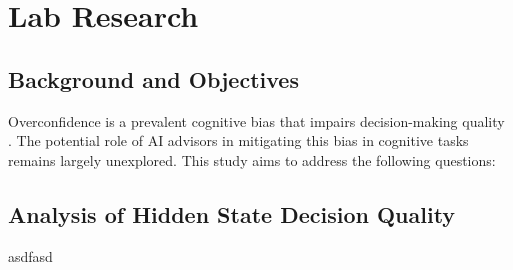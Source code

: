 \documentclass[12pt,a4paper, man]{article}
\begin{document}
\begingroup
{} 
\onehalfspacing 
\tableofcontents
\clearpage
\endgroup


\begingroup
\setlength{\parskip}{0.2\baselineskip}
\section{Lab Research}
\subsection{Background and Objectives}

Overconfidence is a prevalent cognitive bias that impairs decision-making quality \parencite{achtzigerFastRationalResponseTimes2014}. The potential role of AI advisors in mitigating this bias in cognitive tasks remains largely unexplored. This study aims to address the following questions:


\subsection{Analysis of Hidden State Decision Quality}
asdfasd




\endgroup

\printbibliography 
\end{document}
